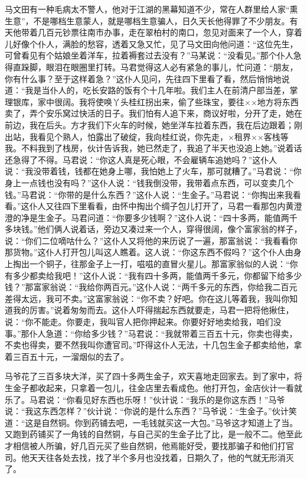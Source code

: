 \documentclass[12pt,UTF8]{ctexbook}
\begin{document}
马文田有一种毛病太不警人，他对于江湖的黑幕知道不少，常在人群里给人家“熏生意”，不是哪档生意蒙人，就是哪档生意骗人，日久天长他得罪了不少朋友。有天他带着几百元钞票往南市办事，走在翠柏村的南口，忽见对面来了一个人，穿着儿好像个仆人，满脸的愁容，透着又急又忙，见了马文田向他问道：“这位先生，可曾看见有个姑娘坐着洋车，拉着褥套过去没有？”马某说：“没看见。”那个仆人急得直跺脚，眼泪在眼圈里打转。马君觉得这人必有紧急的事儿，忙问道：“朋友，你有什么事？至于这样着急？”这仆人见问，先往四下里看了看，然后悄悄地说道：“我是当仆人的，吃长安路的饭有个十几年啦。我们主人在前清户部当差，掌理银库，家中很阔。我将使唤丫头桂红拐出来，偷了些珠宝，要往××地方将东西卖了，弄个安乐窝过快活的日子。我们怕有人追下来，商议好啦，分开了走，她在前边，我在后头。方才我们下火车的时候，她坐洋车拉着东西，我在后边跟着；刚出站，我看见个熟人，怕露出了破绽，我向桂红说，你先走，×租界××客栈等我。不料我到了栈房，伙计告诉我，她已然走了，我追了半天也没追上她。”说着话还急得了不得。马君说：“你这人真是死心眼，不会雇辆车追她吗？”这仆人说：“我没带着钱，钱都在她身上哪，我怕她上了火车，那可就糟了。”马君说：“你身上一点钱也没有吗？”这仆人说：“钱我倒没带，我带着点东西，可以变卖几个钱。”马君说：“你带的是什么东西？”这仆人说：“生金子。”马君说：“你掏出来我看看。”这仆人又往四下里看看，由怀中掏出个绸子包儿打开了，马君一看那包内黄澄澄的净是生金子。马君问道：“你要多少钱啊？”这仆人说：“四十多两，能值两千多块钱。”他们俩人说着话，旁边又凑过来一个人，穿得很阔，像个富家翁的样子，说：“你们二位嘀咕什么？”这仆人又将他的来历说了一遍，那富翁说：“我看看你那货物。”这仆人打开包儿叫这人瞧着。这人说：“你这东西不假吗？”这个仆人由身上掏出一个铜子，往那金子上一打，嗞嗞的直冒火星儿。那富家翁似的人说：“你有多少都卖给我吧！”这仆人说：“我有四十多两，能值两千多元，你都留下给多少钱？”那富家翁说：“我给你两百元。”这仆人说：“两千多元的东西，你给我二百元差得太远，我可不卖。”这富家翁说：“你不卖？好吧。你在这儿等着我，我叫你知道我的厉害。”说着匆匆而去。这仆人吓得揣起东西就要走，马君一把将他揪住，说：“你不能走。你要走，我叫官人把你押起来。你要好好地卖给我，咱们没事。”那仆人急道：“你给多少钱？”马君说：“我就带着三百五十元，你卖也得卖，不卖也得卖，要不然我叫你遭官司。”吓得这仆人无法，十几包生金子都卖给他，拿着三百五十元，一溜烟似的去了。

马爷花了三百多块大洋，买了四十多两生金子，欢天喜地走回家去。到了家中，将生金子都收起来，只拿着一包儿，往金店里去看成色。他打开包，金店伙计一看就乐了。马君说：“你看见好东西也乐呀！”伙计说：“我乐的是你这东西！”马爷说：“我这东西怎样？”伙计说：“你说的是什么东西？”马爷说：“生金子。”伙计笑道：“这是自然铜。你到药铺去吧，一毛钱就买这一大包。”马爷这才知道上了当。又跑到药铺买了一角钱的自然铜，与自己买的生金子比了比，是一般不二。他至此才相信被人所骗，好几百元买了些自然铜，他焉能好受，要找那骗子和他们打官司。他天天往各处去找，找了半个多月也没找着，日期久了，他的气就无形消灭了。
\end{document}
